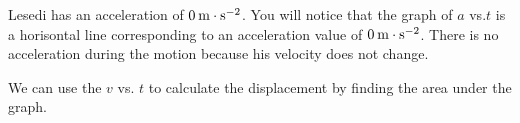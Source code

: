         
        \label{m38795*id70807}Lesedi has an acceleration of \begin{math}0\phantom{\rule{2pt}{0ex}}\mathrm{m}\ensuremath{\cdot}\mathrm{s}{}^{-2}\end{math}. You will notice that the graph of \begin{math}a\end{math} vs.\begin{math}t\end{math} is a horisontal line corresponding to an acceleration value of \begin{math}0\phantom{\rule{2pt}{0ex}}\mathrm{m}\ensuremath{\cdot}\mathrm{s}{}^{-2}\end{math}. There is no acceleration during the motion because his velocity does not change.\par 
        \label{m38795*id70880}We can use the \begin{math}v\end{math} vs. \begin{math}t\end{math} to calculate the displacement by finding the area under the graph.\par 
        \label{m38795*id70902}\nopagebreak\noindent{}
